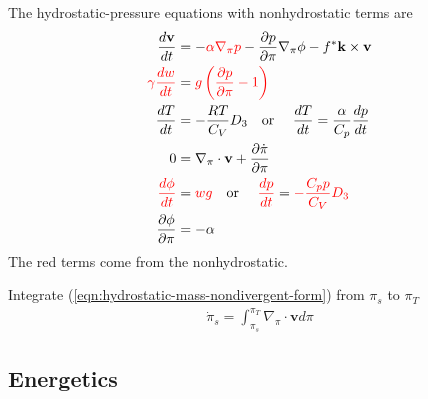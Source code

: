 \documentclass[12pt]{article}
\numberwithin{equation}{section}
\renewcommand{\d}[2]{\frac{d #1}{d #2}}
\newcommand{\dt}[1]{\d{#1}{t}}
\newcommand{\pd}[2]{\frac{\partial #1}{\partial #2}}
\renewcommand{\vec}[1]{\mathbf{#1}}
\newcommand{\grad}[2][\pi]{\nabla_{#1} #2}
\renewcommand{\div}[2][\pi]{\nabla_{#1} \cdot #2}
\begin{document}
The hydrostatic-pressure equations with nonhydrostatic terms are
\begin{align}
  \dt{\vec{v}} & = - {\color{red}\alpha \grad{p}} - \pd{p}{\pi} \grad{\phi} - f^* \vec{k} \times \vec{v} \label{eqn:hydrostatic-horz-momentum} \\
  {\color{red}\gamma \dt{w}} & = {\color{red}g \left(\pd{p}{\pi} - 1\right)} \label{eqn:hydrostatic-vert-momentum} \\
  \dt{T} & = - \frac{R T}{C_V} D_3 \text{\quad or \quad} \dt{T} = \frac{\alpha}{C_p} \dt{p} \label{eqn:hydrostatic-thermo} \\
  0 & = \div{\vec{v}} + \pd{\dot{\pi}}{\pi} \\
  {\color{red}\dt{\phi}} & = {\color{red}w g} \text{\quad or \quad} {\color{red}\dt{p}} = {\color{red}- \frac{C_p p}{C_V} D_3} \\
  \pd{\phi}{\pi} & = - \alpha
\end{align}
The red terms come from the nonhydrostatic.

Integrate (\ref{eqn:hydrostatic-mass-nondivergent-form}) from $\pi_s$ to $\pi_T$
\begin{align*}
  \dot{\pi}_s = \int_{\pi_s}^{\pi_T} \div{\vec{v}} d\pi
\end{align*}

\subsection{Energetics}
\end{document}
